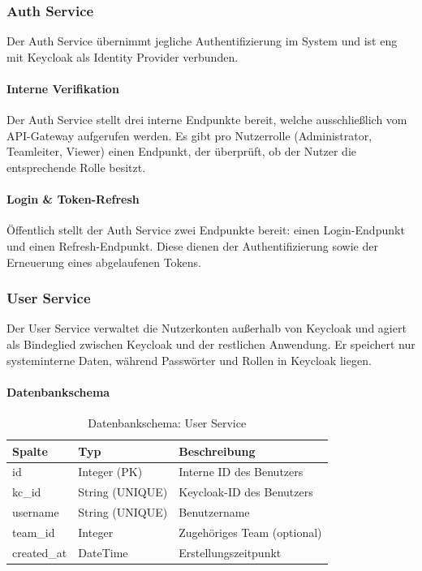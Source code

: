 \newpage

\subsubsection{Auth Service}
\label{sec:auth_service}
Der Auth Service übernimmt jegliche Authentifizierung im System und ist eng mit 
Keycloak als Identity Provider verbunden. 

\paragraph{Interne Verifikation}
Der Auth Service stellt drei interne Endpunkte bereit, welche ausschließlich 
vom \gls{API}-Gateway aufgerufen werden. Es gibt pro Nutzerrolle (Administrator, Teamleiter, Viewer) 
einen Endpunkt, der überprüft, ob der Nutzer die entsprechende Rolle besitzt.

\paragraph{Login \& Token-Refresh}
Öffentlich stellt der Auth Service zwei Endpunkte bereit: einen Login-Endpunkt
und einen Refresh-Endpunkt. Diese dienen der Authentifizierung sowie der Erneuerung eines abgelaufenen Tokens.

\subsubsection{User Service}
\label{sec:user_service}
Der User Service verwaltet die Nutzerkonten außerhalb von Keycloak und agiert 
als Bindeglied zwischen Keycloak und der restlichen Anwendung. Er speichert nur systeminterne Daten,
während Passwörter und Rollen in Keycloak liegen.

\paragraph{Datenbankschema}
\begin{table}[h]
    \centering
    \begin{tabular}{|l|l|l|}
        \hline
        \textbf{Spalte} & \textbf{Typ} & \textbf{Beschreibung} \\
        \hline
        id & Integer (PK) & Interne ID des Benutzers \\
        kc\_id & String (UNIQUE) & Keycloak-ID des Benutzers \\
        username & String (UNIQUE) & Benutzername \\
        team\_id & Integer & Zugehöriges Team (optional) \\
        created\_at & DateTime & Erstellungszeitpunkt \\
        \hline
    \end{tabular}
    \caption{Datenbankschema: User Service}
    \label{tab:user_schema}
\end{table}

